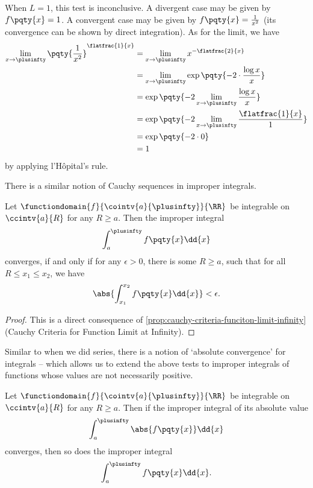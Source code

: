 \begin{remark}
    When \(L = 1\), this test is inconclusive. A divergent case may be given by \(f\pqty{x} = 1\). A convergent case may be given by \(f\pqty{x} = \frac{1}{x^2}\) (its convergence can be shown by direct integration). As for the limit, we have
    \begin{align*}
        \lim_{x \to \plusinfty} \pqty{\frac{1}{x^2}}^{\flatfrac{1}{x}} &= \lim_{x \to \plusinfty} x^{- \flatfrac{2}{x}} \\
        &= \lim_{x \to \plusinfty} \exp\pqty{- 2 \cdot \frac{\log x}{x}} \\
        &= \exp\pqty{-2 \lim_{x \to \plusinfty} \frac{\log x}{x}} \\
        &= \exp\pqty{-2 \lim_{x \to \plusinfty} \frac{\flatfrac{1}{x}}{1}} \\
        &= \exp\pqty{-2 \cdot 0} \\
        &= 1
    \end{align*}
    by applying l'H\^{o}pital's rule.
\end{remark}

There is a similar notion of Cauchy sequences in improper integrals.

\begin{proposition}
    \label{prop:int-cauchy}%
    Let \(\functiondomain{f}{\cointv{a}{\plusinfty}}{\RR}\) be integrable on \(\ccintv{a}{R}\) for any \(R \geq a\). Then the improper integral
    \[
        \int_{a}^{\plusinfty} f\pqty{x} \dd{x}
    \]
    converges, if and only if for any \(\epsilon > 0\), there is some \(R \geq a\), such that for all \(R \leq x_1 \leq x_2\), we have
    \[
        \abs{\int_{x_1}^{x_2} f\pqty{x} \dd{x}} < \epsilon.
    \]
\end{proposition}

\begin{proof}
    This is a direct consequence of \autoref{prop:cauchy-criteria-funciton-limit-infinity} (Cauchy Criteria for Function Limit at Infinity).
\end{proof}

Similar to when we did series, there is a notion of `absolute convergence' for integrals -- which allows us to extend the above tests to improper integrals of functions whose values are not necessarily positive.

\begin{proposition}
    \label{prop:int-absolute-convergence}%
    Let \(\functiondomain{f}{\cointv{a}{\plusinfty}}{\RR}\) be integrable on \(\ccintv{a}{R}\) for any \(R \geq a\). Then if the improper integral of its absolute value
    \[
        \int_{a}^{\plusinfty} \abs{f\pqty{x}} \dd{x}
    \]
    converges, then so does the improper integral
    \[
        \int_{a}^{\plusinfty} f\pqty{x} \dd{x}.
    \]
\end{proposition}

